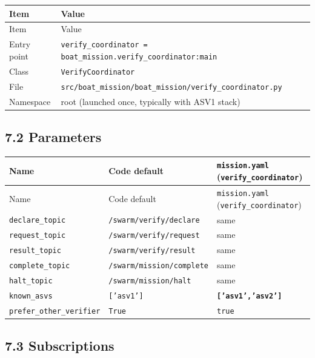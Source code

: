 \begin{center}
\small
\begin{longtable}{@{}lp{10cm}@{}}
\toprule
Item & Value \\
\midrule
\endfirsthead
\toprule
Item & Value \\
\midrule
\endhead
Entry point & \texttt{verify\_coordinator = boat\_mission.verify\_coordinator:main} \\
Class & \texttt{VerifyCoordinator} \\
File & \texttt{src/boat\_mission/boat\_mission/verify\_coordinator.py} \\
Namespace & root (launched once, typically with ASV1 stack) \\
\bottomrule
\end{longtable}
\end{center}


\subsection{7.2 Parameters}


\begin{center}
\small
\begin{longtable}{@{}llp{7.2cm}@{}}
\toprule
Name & Code default & \texttt{mission.yaml} (\texttt{verify\_coordinator}) \\
\midrule
\endfirsthead
\toprule
Name & Code default & \texttt{mission.yaml} (\texttt{verify\_coordinator}) \\
\midrule
\endhead
\texttt{declare\_topic} & \texttt{/swarm/verify/declare} & same \\
\texttt{request\_topic} & \texttt{/swarm/verify/request} & same \\
\texttt{result\_topic} & \texttt{/swarm/verify/result} & same \\
\texttt{complete\_topic} & \texttt{/swarm/mission/complete} & same \\
\texttt{halt\_topic} & \texttt{/swarm/mission/halt} & same \\
\texttt{known\_asvs} & \texttt{['asv1']} & \textbf{\texttt{['asv1','asv2']}} \\
\texttt{prefer\_other\_verifier} & \texttt{True} & \texttt{true} \\
\bottomrule
\end{longtable}
\end{center}


\subsection{7.3 Subscriptions}



